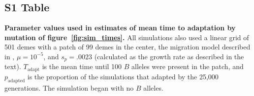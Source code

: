 \documentclass[10pt,letterpaper]{article}
\DeclareMathOperator{\sn}{sn}
\begin{document}
% 
% 

% 


\subsection*{S1 Table}
\label{stab:mutation_params}

%

\textbf{Parameter values used in estimates of mean time to adaptation by mutation of figure~\ref{fig:sim_times}.}
All simulations also used a linear grid of 501 demes with a patch of 99 demes in the center, 
the migration model described in ,
$\mu=10^{-5}$, and $s_p=.0023$ (calculated as the growth rate as described in the text).
$T_\text{adapt}$ is the mean time until 100 $B$ alleles were present in the patch,
and $p_\text{adapted}$ is the proportion of the simulations that adapted by the 25,000 generations.
The simulation began with no $B$ alleles.
\end{document}
